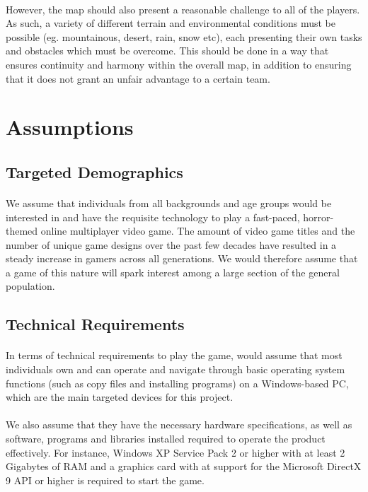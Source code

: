 \documentclass{article}
\begin{document}
\paragraph{}However, the map should also present a reasonable challenge to all of the players. As such, a
variety of different terrain and environmental conditions must be possible (eg. mountainous, desert, rain,
snow etc), each presenting their own tasks and obstacles which must be overcome. This should be done in
a way that ensures continuity and harmony within the overall map, in addition to ensuring that it does not
grant an unfair advantage to a certain team.

\section{Assumptions}

\subsection{Targeted Demographics}

\paragraph{}We assume that individuals from all backgrounds and age groups would be interested  in and have the requisite technology to play a fast-paced, horror-themed online multiplayer video game. The amount of video game titles and the number of unique game designs over the past few decades have resulted in a steady increase in gamers across all generations. We would therefore assume that a game of this nature will spark interest among a large section of the general population.

\subsection{Technical Requirements}

\paragraph{}In terms of technical requirements to play the game, would assume that most individuals own and can operate and navigate through basic operating system functions (such as copy files and installing programs) on a Windows-based PC, which are the main targeted devices for this project.

\paragraph{}We also assume that they have the necessary hardware specifications, as well as software, programs and libraries installed required to operate the product effectively. For instance, Windows XP Service Pack 2 or higher with at least 2 Gigabytes of RAM and a graphics card with at support for the Microsoft DirectX 9 API or higher is required to start the game. 
\end{document}
